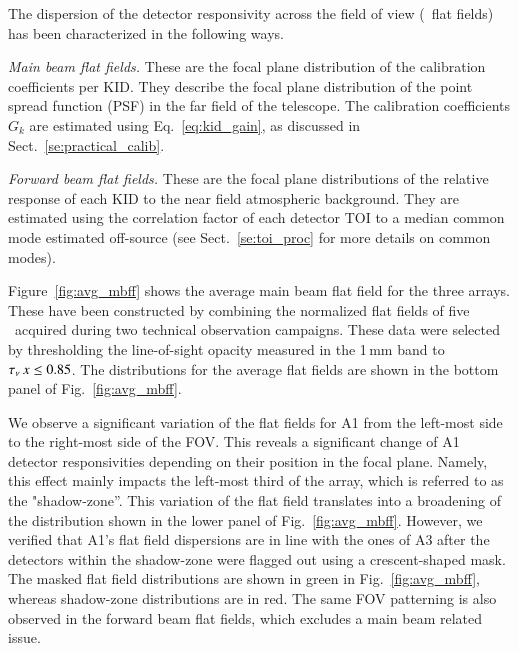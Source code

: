 The dispersion of the detector responsivity across the field of view (\aka\ flat
fields) has been characterized in the following ways.

\noindent \emph{Main beam flat fields.} These are the focal plane
distribution of the calibration coefficients per KID. {\lp They describe the
focal plane distribution of the point spread function (PSF) in
the far field of the telescope.} The calibration coefficients $G_k$ are
estimated using Eq.~\ref{eq:kid_gain}, as discussed in
Sect.~\ref{se:practical_calib}. 

\noindent \emph{Forward beam flat fields.} These are the focal plane
distributions of the relative response of
each KID to the near field atmospheric background. They are estimated
using the correlation factor of each detector TOI 
to a median common mode estimated off-source (see Sect.~\ref{se:toi_proc} for
more details on common modes).

Figure~\ref{fig:avg_mbff} %
shows the average main beam %
flat field for the three arrays. These have been constructed by
combining the normalized flat fields of five \bms\ acquired during two
technical observation campaigns. These data were
selected by thresholding the line-of-sight opacity measured in the
1\,mm band to $\tau_{\nu}\,x \leq 0.85$. The distributions for the average flat
fields are shown in the bottom panel of Fig.~\ref{fig:avg_mbff}.%

We observe a significant variation of the flat fields for A1 from the left-most side
to the right-most side of the FOV. This reveals a significant change of A1
detector responsivities depending on their position in the focal plane. Namely, this
effect mainly impacts the left-most third of the array, which is
referred to as the "shadow-zone''. This variation of the
flat field translates into a broadening of the distribution shown in
the lower panel of Fig.~\ref{fig:avg_mbff}.  However,
we verified that A1's flat field dispersions are in line with the ones of A3 after the
detectors within the shadow-zone were flagged out using a
crescent-shaped mask. The masked flat field distributions are shown in
green in Fig.~\ref{fig:avg_mbff}, %
whereas shadow-zone distributions are in red. The same FOV patterning
is also observed in the forward beam flat fields, which excludes a
main beam related issue. 


